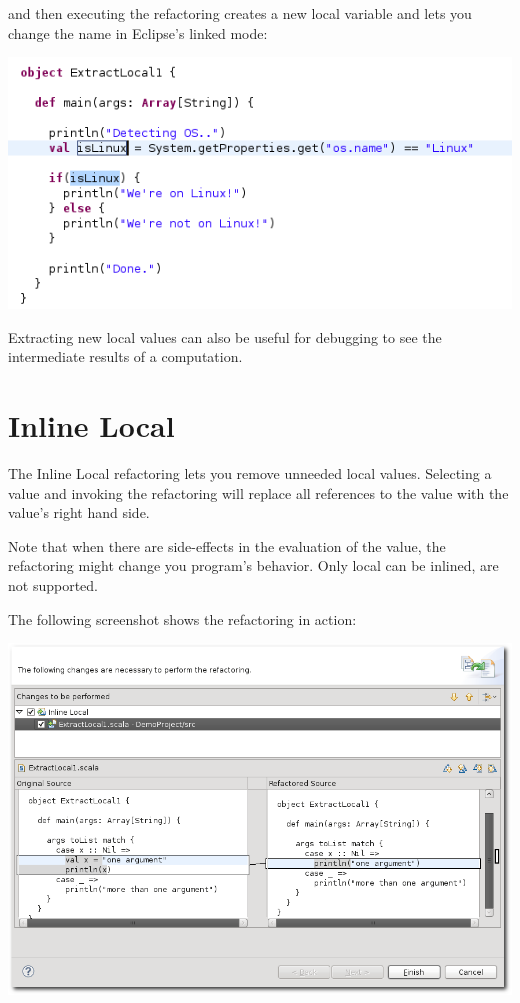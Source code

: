 \documentclass[10pt,a4paper,oneside]{scrreprt}
\begin{document}
and then executing the refactoring creates a new local variable and lets you change the name in Eclipse's linked mode:

\begin{center}
  \includegraphics[width=0.8\linewidth]{extract_local_screenshot_3.png}
\end{center}

Extracting new local values can also be useful for debugging to see the intermediate results of a computation.

\section{Inline Local}

The Inline Local refactoring lets you remove unneeded local values. Selecting a value and invoking the refactoring will replace all references to the value with the value's right hand side.

Note that when there are side-effects in the evaluation of the value, the refactoring might change you program's behavior. Only local  can be inlined,  are not supported.

The following screenshot shows the refactoring in action:

\begin{center}
  \includegraphics[width=\linewidth]{inline_local_screenshot_1.png}
\end{center}
\end{document}
